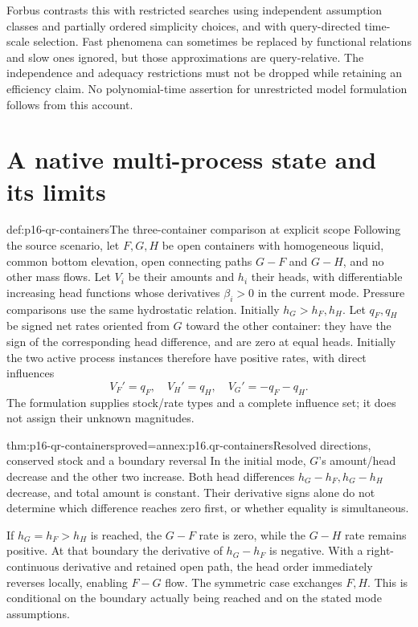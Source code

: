 Forbus contrasts this with restricted searches using independent assumption
classes and partially ordered simplicity choices, and with query-directed
time-scale selection. Fast phenomena can sometimes be replaced by functional
relations and slow ones ignored, but those approximations are query-relative.
The independence and adequacy restrictions must not be dropped while retaining
an efficiency claim. No polynomial-time assertion for unrestricted model
formulation follows from this account.

\section{A native multi-process state and its limits}
\label{sec:p16-qr-containers}

\begin{hbdefinition}{def:p16-qr-containers}{The three-container comparison at explicit scope}
Following the source scenario, let \(F,G,H\) be open containers with
homogeneous liquid, common bottom elevation, open connecting paths \(G-F\)
and \(G-H\), and no other mass flows. Let \(V_i\) be their amounts and
\(h_i\) their heads, with differentiable increasing head functions whose
derivatives \(\beta_i>0\) in the current mode. Pressure comparisons use
the same hydrostatic relation. Initially \(h_G>h_F,h_H\).
Let \(q_F,q_H\) be signed net rates oriented from \(G\) toward the
other container: they have the sign of the corresponding head difference,
and are zero at equal heads. Initially the two active process instances
therefore have positive rates, with direct influences
\[
 V_F'=q_F,\quad V_H'=q_H,\quad V_G'=-q_F-q_H.
\]
The formulation supplies stock/rate types and a complete influence set;
it does not assign their unknown magnitudes.
\end{hbdefinition}

\begin{hbtheorem}{thm:p16-qr-containers}{proved=annex:p16.qr-containers}{Resolved directions, conserved stock and a boundary reversal}
In the initial mode, \(G\)'s amount/head decrease and the other two increase.
Both head differences \(h_G-h_F,h_G-h_H\) decrease, and total amount is
constant. Their derivative signs alone do not determine which difference
reaches zero first, or whether equality is simultaneous.

If \(h_G=h_F>h_H\) is reached, the \(G-F\) rate is zero, while
the \(G-H\) rate remains positive. At that boundary the derivative of
\(h_G-h_F\) is negative. With a right-continuous derivative and retained
open path, the head order immediately reverses locally, enabling \(F-G\)
flow. The symmetric case exchanges \(F,H\). This is conditional on the
boundary actually being reached and on the stated mode assumptions.
\end{hbtheorem}

